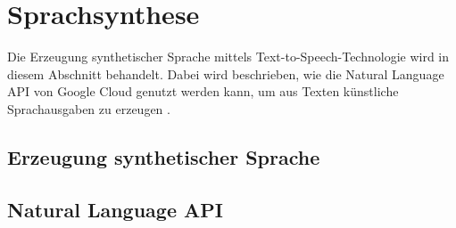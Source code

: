 \documentclass[12pt,a4paper]{article}
\begin{document}
\newpage

\section{Sprachsynthese}
Die Erzeugung synthetischer Sprache mittels Text-to-Speech-Technologie wird in diesem Abschnitt behandelt. Dabei wird beschrieben, wie die Natural Language API von Google Cloud genutzt werden kann, um aus Texten künstliche Sprachausgaben zu erzeugen \cite{texttospeech2023}.
\subsection{Erzeugung synthetischer Sprache}
\subsection{Natural Language API}



\newpage
\thispagestyle{empty}
\printbibliography
\end{document}
